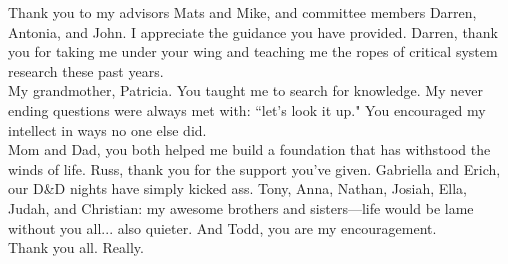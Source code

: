 
Thank you to my advisors Mats and Mike, and committee members Darren, Antonia, and John. I appreciate the guidance you have provided. Darren, thank you for taking me under your wing and teaching me the ropes of critical system research these past years.\\

My grandmother, Patricia. You taught me to search for knowledge.  My never ending questions were always met with: ``let's look it up." You encouraged my intellect in ways no one else did. \\

Mom and Dad, you both helped me build a foundation that has withstood the winds of life. Russ, thank you for the support you've given. Gabriella and Erich, our D\&D nights have simply kicked ass. Tony, Anna, Nathan, Josiah, Ella, Judah, and Christian: my awesome brothers and sisters---life would be lame without you all... also quieter. And Todd, you are my encouragement. \\

Thank you all. Really. 


